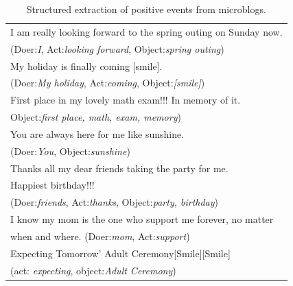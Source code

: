 \begin{table}
\begin{center}
\caption{\small{Structured extraction of positive events from microblogs.}}
\small{
\begin{tabular}{l} \hline \rowcolor{gray!40}
I am really looking forward to the spring outing on Sunday now. \\ \rowcolor{gray!40}
(Doer:\emph{I}, Act:\emph{looking forward}, Object:\emph{spring outing})\\
My holiday is finally coming [smile]. \\
(Doer:\emph{My holiday}, Act:\emph{coming}, Object:\emph{[smile]})\\ \rowcolor{gray!40}%
First place in my lovely math exam!!! In memory of it.\\ \rowcolor{gray!40}
Object:\emph{first place, math, exam, memory})\\ %
You are always here for me like sunshine. \\
(Doer:\emph{You}, Object:\emph{sunshine})\\ \rowcolor{gray!40} %
Thanks all my dear friends taking the party for me. \\ \rowcolor{gray!40}
Happiest birthday!!!\\ \rowcolor{gray!40}
(Doer:\emph{friends}, Act:\emph{thanks}, Object:\emph{party, birthday})\\
I know my mom is the one who support me forever, no matter \\
when and where. (Doer:\emph{mom}, Act:\emph{support})\\ \rowcolor{gray!40}
Expecting Tomorrow' Adult Ceremony[Smile][Smile]~~\\ \rowcolor{gray!40}
(act: \emph{expecting}, object:\emph{Adult Ceremony})\\ \hline
\end{tabular}}
\label{tab:uplifts}
\end{center}
\end{table}

